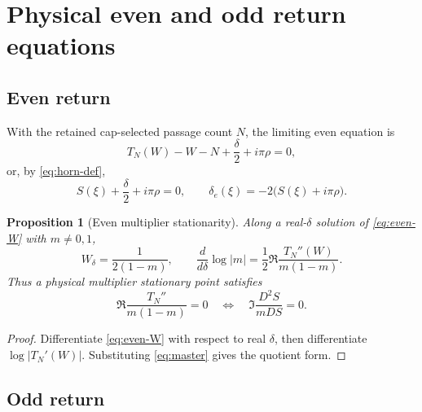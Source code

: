 \documentclass[11pt]{article}
\newtheorem{proposition}[theorem]{Proposition}
\theoremstyle{definition}
\theoremstyle{remark}
\begin{document}
\section{Physical even and odd return equations}

\subsection{Even return}

With the retained cap-selected passage count $N$, the limiting even equation is
\begin{equation}
  T_N(W)-W-N+\frac\delta2+i\pi\rho=0,
  \label{eq:even-W}
\end{equation}
or, by \cref{eq:horn-def},
\begin{equation}
  S(\xi)+\frac\delta2+i\pi\rho=0,
  \qquad
  \delta_e(\xi)=-2\bigl(S(\xi)+i\pi\rho\bigr).
  \label{eq:even-xi}
\end{equation}

\begin{proposition}[Even multiplier stationarity]\label{prop:even-morse}
Along a real-$\delta$ solution of \cref{eq:even-W} with $m\ne0,1$,
\begin{equation}
  W_\delta=\frac{1}{2(1-m)},
  \qquad
  \frac{d}{d\delta}\log|m|
  =\frac12\Re\frac{T_N''(W)}{m(1-m)}.
  \label{eq:even-morse}
\end{equation}
Thus a physical multiplier stationary point satisfies
\begin{equation}
  \Re\frac{T_N''}{m(1-m)}=0
  \quad\Longleftrightarrow\quad
  \Im\frac{D^2S}{mDS}=0.
  \label{eq:even-morse-D}
\end{equation}
\end{proposition}

\begin{proof}
Differentiate \cref{eq:even-W} with respect to real $\delta$, then differentiate $\log|T_N'(W)|$.  Substituting \cref{eq:master} gives the quotient form.
\end{proof}

\subsection{Odd return}
\end{document}
